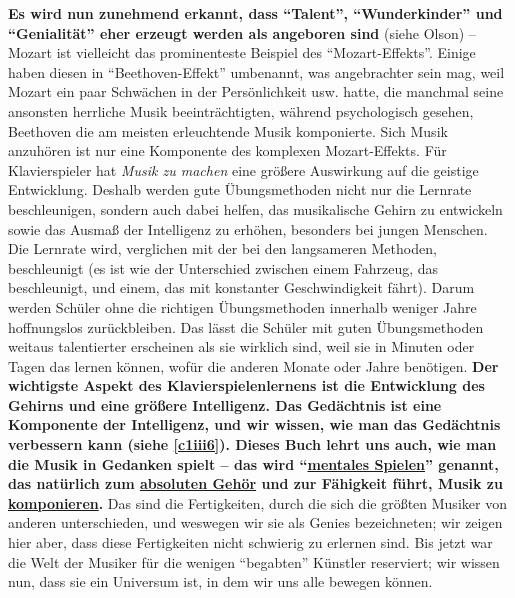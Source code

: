 \textbf{Es wird nun zunehmend erkannt, dass \enquote{Talent}, \enquote{Wunderkinder} und \enquote{Genialität} eher erzeugt werden als angeboren sind} (siehe Olson) -- Mozart ist vielleicht das prominenteste Beispiel des \enquote{Mozart-Effekts}.
Einige haben diesen in \enquote{Beethoven-Effekt} umbenannt, was angebrachter sein mag, weil Mozart ein paar Schwächen in der Persönlichkeit usw. hatte, die manchmal seine ansonsten herrliche Musik beeinträchtigten, während psychologisch gesehen, Beethoven die am meisten erleuchtende Musik komponierte.
Sich Musik anzuhören ist nur eine Komponente des komplexen Mozart-Effekts.
Für Klavierspieler hat \textit{Musik zu machen} eine größere Auswirkung auf die geistige Entwicklung.
Deshalb werden gute Übungsmethoden nicht nur die Lernrate beschleunigen, sondern auch dabei helfen, das musikalische Gehirn zu entwickeln sowie das Ausmaß der Intelligenz zu erhöhen, besonders bei jungen Menschen.
Die Lernrate wird, verglichen mit der bei den langsameren Methoden, beschleunigt (es ist wie der Unterschied zwischen einem Fahrzeug, das beschleunigt, und einem, das mit konstanter Geschwindigkeit fährt).
Darum werden Schüler ohne die richtigen Übungsmethoden innerhalb weniger Jahre hoffnungslos zurückbleiben.
Das lässt die Schüler mit guten Übungsmethoden weitaus talentierter erscheinen als sie wirklich sind, weil sie in Minuten oder Tagen das lernen können, wofür die anderen Monate oder Jahre benötigen.
\textbf{Der wichtigste Aspekt des Klavierspielenlernens ist die Entwicklung des Gehirns und eine größere Intelligenz.
Das Gedächtnis ist eine Komponente der Intelligenz, und wir wissen, wie man das Gedächtnis verbessern kann (siehe \hyperref[c1iii6]{\autoref{c1iii6}}).
Dieses Buch lehrt uns auch, wie man die Musik in Gedanken spielt -- das wird \enquote{\hyperref[c1ii12mental]{mentales Spielen}} genannt, das natürlich zum \hyperref[c1iii12]{absoluten Gehör} und zur Fähigkeit führt, Musik zu \hyperref[c1iii12blatt]{komponieren}.}
Das sind die Fertigkeiten, durch die sich die größten Musiker von anderen unterschieden, und weswegen wir sie als Genies bezeichneten; wir zeigen hier aber, dass diese Fertigkeiten nicht schwierig zu erlernen sind.
Bis jetzt war die Welt der Musiker für die wenigen \enquote{begabten} Künstler reserviert; wir wissen nun, dass sie ein Universum ist, in dem wir uns alle bewegen können.

